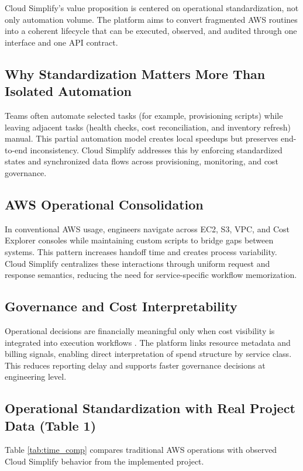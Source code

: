 Cloud Simplify's value proposition is centered on operational standardization, not only automation volume. The platform aims to convert fragmented AWS routines into a coherent lifecycle that can be executed, observed, and audited through one interface and one API contract.

\subsection{Why Standardization Matters More Than Isolated Automation}
Teams often automate selected tasks (for example, provisioning scripts) while leaving adjacent tasks (health checks, cost reconciliation, and inventory refresh) manual. This partial automation model creates local speedups but preserves end-to-end inconsistency. Cloud Simplify addresses this by enforcing standardized states and synchronized data flows across provisioning, monitoring, and cost governance.

\subsection{AWS Operational Consolidation}
In conventional AWS usage, engineers navigate across EC2, S3, VPC, and Cost Explorer consoles while maintaining custom scripts to bridge gaps between systems. This pattern increases handoff time and creates process variability. Cloud Simplify centralizes these interactions through uniform request and response semantics, reducing the need for service-specific workflow memorization.

\subsection{Governance and Cost Interpretability}
Operational decisions are financially meaningful only when cost visibility is integrated into execution workflows \cite{mckinsey2023costs, flexera2024}. The platform links resource metadata and billing signals, enabling direct interpretation of spend structure by service class. This reduces reporting delay and supports faster governance decisions at engineering level.

\subsection{Operational Standardization with Real Project Data (Table 1)}
Table \ref{tab:time_comp} compares traditional AWS operations with observed Cloud Simplify behavior from the implemented project.

